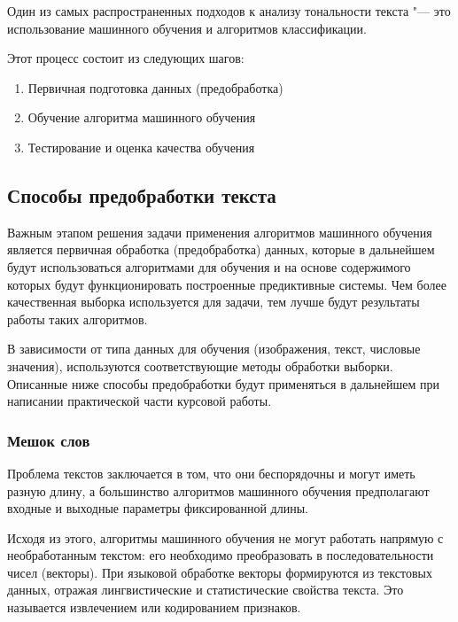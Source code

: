 \documentclass[bachelor, och, coursework]{SCWorks}
\begin{document}
    Один из самых распространенных подходов к анализу тональности текста
    "--- это использование машинного обучения и алгоритмов классификации.

    Этот процесс состоит из следующих шагов:

    \begin{enumerate}
        \item Первичная подготовка данных (предобработка)
        \item Обучение алгоритма машинного обучения
        \item Тестирование и оценка качества обучения
    \end{enumerate}

    \subsection{Способы предобработки текста}

        Важным этапом решения задачи применения алгоритмов машинного обучения
        является первичная обработка (предобработка) данных, которые в
        дальнейшем будут использоваться алгоритмами для обучения и на основе
        содержимого которых будут функционировать построенные предиктивные
        системы. Чем более качественная выборка используется для задачи, тем
        лучше будут результаты работы таких алгоритмов.

        В зависимости от типа данных для обучения (изображения, текст, числовые
        значения), используются соответствующие методы обработки выборки.
        Описанные ниже способы предобработки будут применяться в дальнейшем при
        написании практической части курсовой работы.

        \subsubsection{Мешок слов}

            Проблема текстов заключается в том, что они беспорядочны и могут
            иметь разную длину, а большинство алгоритмов машинного обучения
            предполагают входные и выходные параметры фиксированной длины.

            Исходя из этого, алгоритмы машинного обучения не могут работать
            напрямую с необработанным текстом: его необходимо преобразовать в
            последовательности чисел (векторы). При языковой обработке векторы
            формируются из текстовых данных, отражая лингвистические и
            статистические свойства текста. Это называется извлечением или
            кодированием признаков.
            
\end{document}
